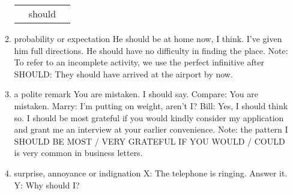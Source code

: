 \begin{enumerate}
\begin{enumerate}
\begin{tabular}{lll}
                    & should &
                \end{tabular}
            \item probability or expectation
                \newline
                \newline
                He should be at home now, I think.
                \newline
                I've given him full directions. He should have no difficulty in
                finding the place.
                \newline
                \newline
                Note: To refer to an incomplete activity, we use the perfect
                infinitive after SHOULD:
                \newline
                \newline
                They should have arrived at the airport by now.
            \item a polite remark
                \newline
                \newline
                You are mistaken. I should say.
                \newline
                Compare: You are mistaken.
                \newline
                \newline
                Marry: I'm putting on weight, aren't I?
                \newline
                Bill: Yes, I should think so.
                \newline
                \newline
                I should be most grateful if you would kindly consider my
                application and grant me an interview at your earlier
                convenience.
                \newline
                \newline
                Note: the pattern I SHOULD BE MOST / VERY GRATEFUL IF YOU WOULD
                / COULD is very common in business letters.
            \item surprise, annoyance or indignation
                \newline
                \newline
                X: The telephone is ringing. Answer it.
                \newline
                Y: Why should I?
                \newline

\end{enumerate}
\end{enumerate}

